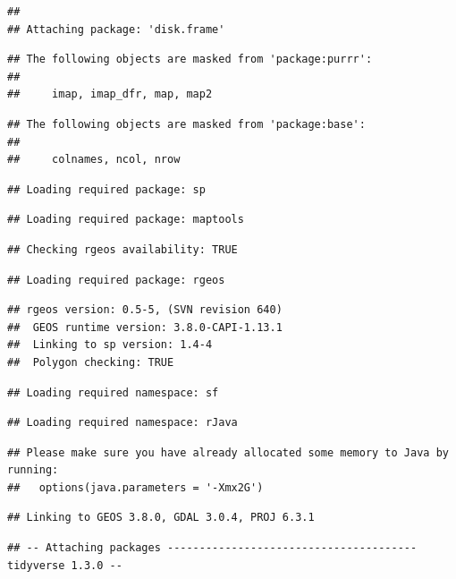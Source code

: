 \documentclass[]{elsarticle} %
\begin{document}
\begin{verbatim}
## 
## Attaching package: 'disk.frame'
\end{verbatim}

\begin{verbatim}
## The following objects are masked from 'package:purrr':
## 
##     imap, imap_dfr, map, map2
\end{verbatim}

\begin{verbatim}
## The following objects are masked from 'package:base':
## 
##     colnames, ncol, nrow
\end{verbatim}

\begin{verbatim}
## Loading required package: sp
\end{verbatim}

\begin{verbatim}
## Loading required package: maptools
\end{verbatim}

\begin{verbatim}
## Checking rgeos availability: TRUE
\end{verbatim}

\begin{verbatim}
## Loading required package: rgeos
\end{verbatim}

\begin{verbatim}
## rgeos version: 0.5-5, (SVN revision 640)
##  GEOS runtime version: 3.8.0-CAPI-1.13.1 
##  Linking to sp version: 1.4-4 
##  Polygon checking: TRUE
\end{verbatim}

\begin{verbatim}
## Loading required namespace: sf
\end{verbatim}

\begin{verbatim}
## Loading required namespace: rJava
\end{verbatim}

\begin{verbatim}
## Please make sure you have already allocated some memory to Java by running:
##   options(java.parameters = '-Xmx2G')
\end{verbatim}

\begin{verbatim}
## Linking to GEOS 3.8.0, GDAL 3.0.4, PROJ 6.3.1
\end{verbatim}

\begin{verbatim}
## -- Attaching packages --------------------------------------- tidyverse 1.3.0 --
\end{verbatim}
\end{document}
